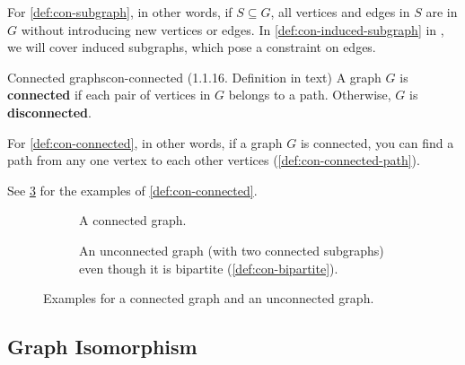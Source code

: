 \documentclass[../src/handouts/main.tex]{subfiles}
\begin{document}
For \cref{def:con-subgraph}, in other words, if $S \subseteq G$, all vertices and edges in $S$ are in $G$ without introducing new vertices or edges. In \cref{def:con-induced-subgraph} in , we will cover induced subgraphs, which pose a constraint on edges.

\begin{definition}{Connected graphs}{con-connected}
  (1.1.16. Definition in text)
  A graph $G$ is \textbf{connected} if each pair of vertices in $G$ belongs to a path. Otherwise, $G$ is \textbf{disconnected}.
\end{definition}

For \cref{def:con-connected}, in other words, if a graph $G$ is connected, you can find a path from any one vertex to each other vertices (\cref{def:con-connected-path}).

See \cref{fig:con-connected-unconnected} for the examples of \cref{def:con-connected}.

\begin{figure}[htbp]
  \centering
  \begin{subfigure}[t]{.4\textwidth}
    \centering
    \tripartitegraph
    \caption{A connected graph.}
    \label{fig:con-connected}
  \end{subfigure}
  \begin{subfigure}[t]{.4\textwidth}
    \centering
    \bipartitegraph
    \caption{An unconnected graph (with two connected subgraphs) even though it is bipartite (\cref{def:con-bipartite}).}
    \label{fig:con-unconnected}
  \end{subfigure}
  \caption{Examples for a connected graph and an unconnected graph.}
  \label{fig:con-connected-unconnected}
\end{figure}

\subsection{Graph Isomorphism}\label{subsec:con-graph-isomorphism}
\end{document}

